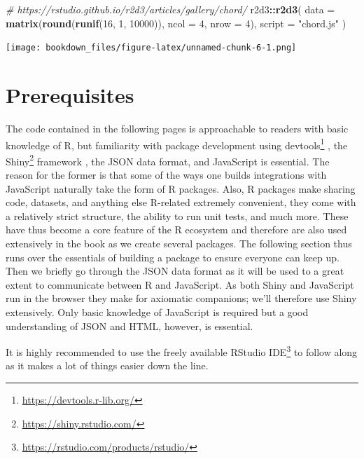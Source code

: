 \documentclass[
]{krantz}
\makeatletter
\newenvironment{Shaded}{\begin{snugshade}}{\end{snugshade}}
\newcommand{\CommentTok}[1]{\textcolor[rgb]{0.37,0.37,0.37}{\textit{#1}}}
\newcommand{\DataTypeTok}[1]{\textcolor[rgb]{0.27,0.27,0.27}{#1}}
\newcommand{\DecValTok}[1]{\textcolor[rgb]{0.06,0.06,0.06}{#1}}
\newcommand{\KeywordTok}[1]{\textcolor[rgb]{0.27,0.27,0.27}{\textbf{#1}}}
\newcommand{\NormalTok}[1]{#1}
\newcommand{\OperatorTok}[1]{\textcolor[rgb]{0.43,0.43,0.43}{\textbf{#1}}}
\newcommand{\StringTok}[1]{\textcolor[rgb]{0.5,0.5,0.5}{#1}}
\renewcommand{\href}[2]{#2\footnote{\url{#1}}}
\newenvironment{kframe}{%
\medskip{}
\setlength{\fboxsep}{.8em}
 \def\at@end@of@kframe{}%
 \ifinner\ifhmode%
  \def\at@end@of@kframe{\end{minipage}}%
  \begin{minipage}{\columnwidth}%
 \fi\fi%
 \def\FrameCommand##1{\hskip\@totalleftmargin \hskip-\fboxsep
 \colorbox{shadecolor}{##1}\hskip-\fboxsep
     \hskip-\linewidth \hskip-\@totalleftmargin \hskip\columnwidth}%
 \MakeFramed {\advance\hsize-\width
   \@totalleftmargin\z@ \linewidth\hsize
   \@setminipage}}%
 {\par\unskip\endMakeFramed%
 \at@end@of@kframe}
\renewenvironment{Shaded}{\begin{kframe}}{\end{kframe}}
\makeatother
\begin{document}
\begin{Shaded}
\begin{Highlighting}[]
\CommentTok{\# https://rstudio.github.io/r2d3/articles/gallery/chord/}
\NormalTok{r2d3}\OperatorTok{::}\KeywordTok{r2d3}\NormalTok{(}
  \DataTypeTok{data =} \KeywordTok{matrix}\NormalTok{(}\KeywordTok{round}\NormalTok{(}\KeywordTok{runif}\NormalTok{(}\DecValTok{16}\NormalTok{, }\DecValTok{1}\NormalTok{, }\DecValTok{10000}\NormalTok{)), }\DataTypeTok{ncol =} \DecValTok{4}\NormalTok{, }\DataTypeTok{nrow =} \DecValTok{4}\NormalTok{), }
  \DataTypeTok{script =} \StringTok{"chord.js"}
\NormalTok{)}
\end{Highlighting}
\end{Shaded}

\texttt{[image: bookdown\_files/figure-latex/unnamed-chunk-6-1.png]}

\hypertarget{prerequisites}{%
\chapter{Prerequisites}\label{prerequisites}}

The code contained in the following pages is approachable to readers with basic knowledge of R, but familiarity with package development using \href{https://devtools.r-lib.org/}{devtools} \citep{R-devtools}, the \href{https://shiny.rstudio.com/}{Shiny} framework \citep{R-shiny}, the JSON data format, and JavaScript is essential. The reason for the former is that some of the ways one builds integrations with JavaScript naturally take the form of R packages. Also, R packages make sharing code, datasets, and anything else R-related extremely convenient, they come with a relatively strict structure, the ability to run unit tests, and much more. These have thus become a core feature of the R ecosystem and therefore are also used extensively in the book as we create several packages. The following section thus runs over the essentials of building a package to ensure everyone can keep up. Then we briefly go through the JSON data format as it will be used to a great extent to communicate between R and JavaScript. As both Shiny and JavaScript run in the browser they make for axiomatic companions; we'll therefore use Shiny extensively. Only basic knowledge of JavaScript is required but a good understanding of JSON and HTML, however, is essential.

It is highly recommended to use the freely available \href{https://rstudio.com/products/rstudio/}{RStudio IDE} to follow along as it makes a lot of things easier down the line.
\end{document}
